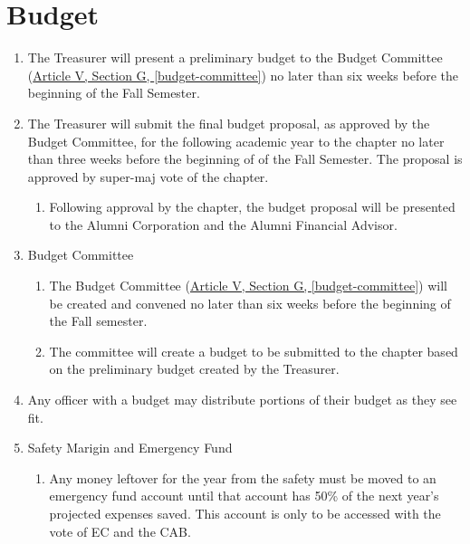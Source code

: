 \section{Budget}
	\label{budget}
	\begin{enumerate}
		\item The Treasurer will present a preliminary budget to the Budget Committee (\hyperref[budget-committee]{Article V, Section G, \autoref*{budget-committee}}) no later than six weeks before the beginning of the Fall Semester.
		\item The Treasurer will submit the final budget proposal, as approved by the Budget Committee, for the following academic year to the chapter no later than three weeks before the beginning of of the Fall Semester. The proposal is approved by \gls{super-maj} vote of the chapter.
			\begin{enumerate}
				\item Following approval by the chapter, the budget proposal will be presented to the Alumni Corporation and the Alumni Financial Advisor.
			\end{enumerate}


		\item Budget Committee
			\begin{enumerate}
				\item The Budget Committee (\hyperref[budget-committee]{Article V, Section G, \autoref*{budget-committee}}) will be created and convened no later than six weeks before the beginning of the Fall semester.
				\item The committee will create a budget to be submitted to the chapter based on the preliminary budget created by the Treasurer.
			\end{enumerate}

        \item Any officer with a budget may distribute portions of their budget as they see fit.


    	\item Safety Marigin and Emergency Fund
        	\begin{enumerate}
            	\item Any money leftover for the year from the \gls{safety} must be moved to an emergency fund account until that account has 50\% of the next year’s projected expenses saved. This account is only to be accessed with the vote of EC and the CAB.
             \end{enumerate}
     \end{enumerate}

